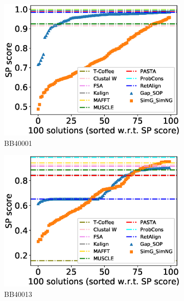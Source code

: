 \begin{figure}[!htbp]
	\centering
	\begin{adjustwidth}{-1.5cm}{-1cm}
		\begin{subfigure}{0.22\textwidth}
			\includegraphics[width=\columnwidth]{Figure/summary/precomputedInit/Balibase/BB40001_pairs_density_single_run_2}
			\caption{BB40001}
		\end{subfigure}	
		\begin{subfigure}{0.22\textwidth}
			\includegraphics[width=\columnwidth]{Figure/summary/precomputedInit/Balibase/BB40013_pairs_density_single_run_2}
			\caption{BB40013}
		\end{subfigure}
		\begin{subfigure}{0.22\textwidth}

\end{subfigure}
\end{adjustwidth}
\end{figure}
